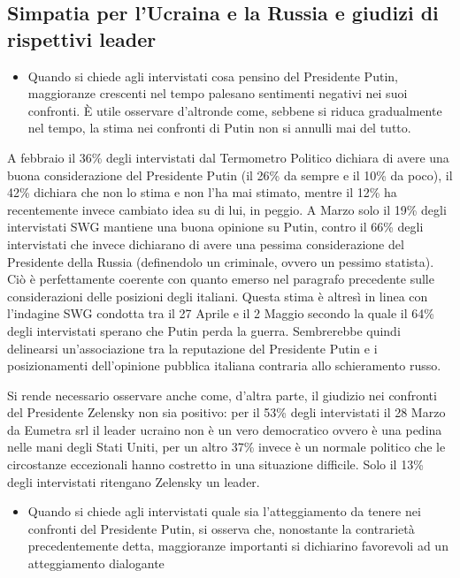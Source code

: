 \documentclass[
]{book}
\providecommand{\tightlist}{%
  \setlength{\itemsep}{0pt}\setlength{\parskip}{0pt}}
\begin{document}
\hypertarget{simpatia-per-lucraina-e-la-russia-e-giudizi-di-rispettivi-leader}{%
\subsection{Simpatia per l'Ucraina e la Russia e giudizi di rispettivi leader}\label{simpatia-per-lucraina-e-la-russia-e-giudizi-di-rispettivi-leader}}

\begin{itemize}
\tightlist
\item
  Quando si chiede agli intervistati cosa pensino del Presidente Putin, maggioranze crescenti nel tempo palesano sentimenti negativi nei suoi confronti. È utile osservare d'altronde come, sebbene si riduca gradualmente nel tempo, la stima nei confronti di Putin non si annulli mai del tutto.
\end{itemize}

A febbraio il 36\% degli intervistati dal Termometro Politico dichiara di avere una buona considerazione del Presidente Putin (il 26\% da sempre e il 10\% da poco), il 42\% dichiara che non lo stima e non l'ha mai stimato, mentre il 12\% ha recentemente invece cambiato idea su di lui, in peggio.
A Marzo solo il 19\% degli intervistati SWG mantiene una buona opinione su Putin, contro il 66\% degli intervistati che invece dichiarano di avere una pessima considerazione del Presidente della Russia (definendolo un criminale, ovvero un pessimo statista). Ciò è perfettamente coerente con quanto emerso nel paragrafo precedente sulle considerazioni delle posizioni degli italiani.
Questa stima è altresì in linea con l'indagine SWG condotta tra il 27 Aprile e il 2 Maggio secondo la quale il 64\% degli intervistati sperano che Putin perda la guerra.
Sembrerebbe quindi delinearsi un'associazione tra la reputazione del Presidente Putin e i posizionamenti dell'opinione pubblica italiana contraria allo schieramento russo.

Si rende necessario osservare anche come, d'altra parte, il giudizio nei confronti del Presidente Zelensky non sia positivo: per il 53\% degli intervistati il 28 Marzo da Eumetra srl il leader ucraino non è un vero democratico ovvero è una pedina nelle mani degli Stati Uniti, per un altro 37\% invece è un normale politico che le circostanze eccezionali hanno costretto in una situazione difficile. Solo il 13\% degli intervistati ritengano Zelensky un leader.

\begin{itemize}
\tightlist
\item
  Quando si chiede agli intervistati quale sia l'atteggiamento da tenere nei confronti del Presidente Putin, si osserva che, nonostante la contrarietà precedentemente detta, maggioranze importanti si dichiarino favorevoli ad un atteggiamento dialogante
\end{itemize}
\end{document}
